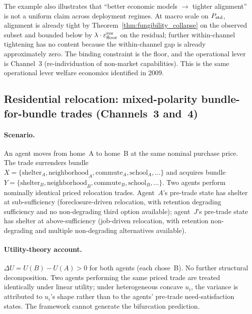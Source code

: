 The example also illustrates that ``better economic models
$\to$ tighter alignment'' is not a uniform claim across
deployment regimes.  At macro scale on $P_{\mathrm{std}}$, alignment is
already tight by Theorem~\ref{thm:fungibility_collapse} on
the observed subset and bounded below by $\lambda \cdot
\varepsilon_{\mathrm{floor}}^{\mathrm{res}}$ on the residual; further within-channel tightening
has no content because the within-channel gap is already
approximately zero.  The binding constraint is the floor, and
the operational lever is Channel~3 (re-individuation of
non-market capabilities).  This is the same operational lever
welfare economics identified in 2009.

\subsection{Residential relocation: mixed-polarity bundle-for-bundle trades (Channels~3 and~4)}
\label{sec:wex_relocation}

\paragraph{Scenario.}
An agent moves from home~A to home~B at the same nominal
purchase price.  The trade surrenders bundle
$X = \{\mathrm{shelter}_A, \mathrm{neighborhood}_A,
\mathrm{commute}_A, \mathrm{school}_A, \dots\}$ and acquires
bundle $Y = \{\mathrm{shelter}_B, \mathrm{neighborhood}_B,
\mathrm{commute}_B, \mathrm{school}_B, \dots\}$.  Two agents
perform nominally identical priced relocation trades.
Agent~$A$'s pre-trade state has shelter at sub-sufficiency
(foreclosure-driven relocation, with retention degrading
sufficiency and no non-degrading third option available);
agent~$J$'s pre-trade state has shelter at above-sufficiency
(job-driven relocation, with retention non-degrading and
multiple non-degrading alternatives available).

\paragraph{Utility-theory account.}
$\Delta U = U(B) - U(A) > 0$ for both agents (each chose~B).
No further structural decomposition.  Two agents performing
the same priced trade are treated identically under linear
utility; under heterogeneous concave $u_i$, the variance is
attributed to $u_i$'s shape rather than to the agents'
pre-trade need-satisfaction states.  The framework cannot
generate the bifurcation prediction.

